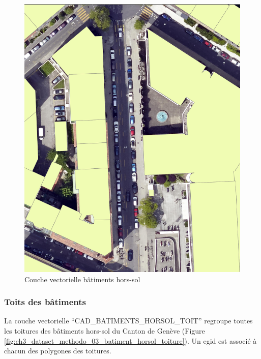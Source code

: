 \begin{figure}[H]
    \centering
    \includegraphics[width=1\linewidth]{02-main//figures/ch3/ch3_dataset_methodo_02_batiment_horsol.png}
    \caption{Couche vectorielle bâtiments hors-sol}
    \label{fig:ch3_dataset_methodo_02_batiment_horsol}
\end{figure}


\newpage
\subsubsection{Toits des bâtiments}
La couche vectorielle ``CAD\_BATIMENTS\_HORSOL\_TOIT'' \cite{sitg_toits_nodate} regroupe toutes les toitures des bâtiments hors-sol du Canton de Genève (Figure \ref{fig:ch3_dataset_methodo_03_batiment_horsol_toiture}). Un \gls{egid} est associé à chacun des polygones des toitures.

